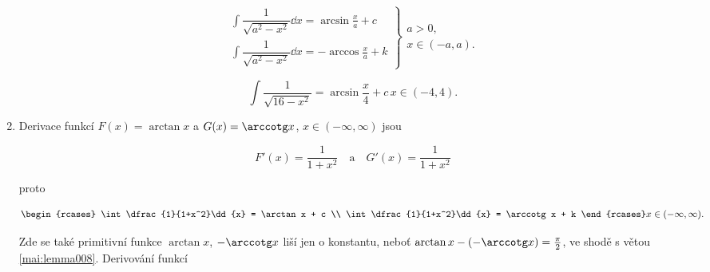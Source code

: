 \begin{enumerate}
\begin{fleqn}[\parindent]
\begin{equation*}
                \left.
                  \begin{array}{r}
                    \int\dfrac{1}{\sqrt{a^2-x^2}}\dd{x} =  \arcsin\frac{x}{a} + c \\
                    \int\dfrac{1}{\sqrt{a^2-x^2}}\dd{x} = -\arccos\frac{x}{a} + k
                  \end{array}
                \right\}
                \begin{array}{c}
                  a>0,      \\
                  x\in(-a,a).
                \end{array}
              \end{equation*}
            \end{fleqn} 
            \begin{fleqn}[\parindent]
              \begin{equation*}
                \int\dfrac{1}{\sqrt{16-x^2}} = \arcsin\dfrac{x}{4} + c \, x\in(-4,4).
              \end{equation*}
            \end{fleqn} 
      \item Derivace funkcí \(F(x) = \arctan x\) a \(G(x) = \arccotg x\), \(x\in(-\infty, \infty)\)
            jsou 
            \begin{fleqn}[\parindent]
              \begin{equation*}
                F'(x) = \dfrac{1}{1+x^2} \quad\text{a}\quad G'(x) = \dfrac{1}{1+x^2}
              \end{equation*}
            \end{fleqn} 
            proto
            \begin{fleqn}[\parindent]
              \begin{equation*}
                \begin{rcases}
                  \int\dfrac{1}{1+x^2}\dd{x} = \arctan x + c  \\
                  \int\dfrac{1}{1+x^2}\dd{x} = \arccotg x + k
                \end{rcases}
                x\in(-\infty, \infty).
              \end{equation*}
            \end{fleqn} 
            Zde se také primitivní funkce \(\arctan x\), \(-\arccotg x\) liší jen o konstantu, neboť
            \(\arctan x - (-\arccotg x) = \frac{\pi}{2}\), ve shodě s větou
            \ref{mai:lemma008}. Derivování funkcí 
            \begin{fleqn}[\parindent]

\end{fleqn}
\end{enumerate}
